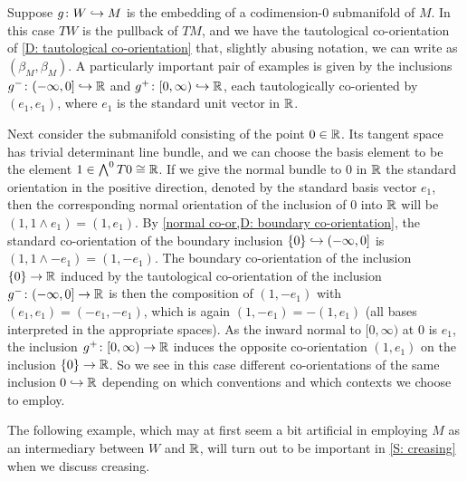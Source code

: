 \begin{example}\label{E: splitting example 1}
	Suppose $g \colon W \hookrightarrow M$ is the embedding of a codimension-$0$ submanifold of $M$.
	In this case $TW$ is the pullback of $TM$, and we have the tautological co-orientation of \cref{D: tautological co-orientation} that, slightly abusing notation, we can write as $(\beta_M,\beta_M)$.
	A particularly important pair of examples is given by the inclusions $g^- \colon (-\infty, 0] \hookrightarrow \mathbb{R}$ and $g^+ \colon [0,\infty) \hookrightarrow \mathbb{R}$, each tautologically co-oriented by $(e_1,e_1)$, where $e_1$ is the standard unit vector in $\mathbb{R}$.

	Next consider the submanifold consisting of the point $0 \in \mathbb{R}$.
	Its tangent space has trivial determinant line bundle, and we can choose the basis element to be the element $1 \in \bigwedge^0 T0 \cong \mathbb{R}$.
    If we give the normal bundle to $0$ in $\mathbb{R}$ the standard orientation in the positive direction, denoted by the standard basis vector $e_1$, then the corresponding normal orientation of the inclusion of $0$ into $\mathbb{R}$ will be $(1, 1 \wedge e_1) = (1, e_1)$.
	By \cref{normal co-or,D: boundary co-orientation}, the standard co-orientation of the boundary inclusion $\{0\} \hookrightarrow (-\infty, 0]$ is $(1, 1 \wedge -e_1) = (1, -e_1)$.
	The boundary co-orientation of the inclusion $\{0\} \to \mathbb{R}$ induced by the tautological co-orientation of the inclusion $g^- \colon (-\infty, 0] \to \mathbb{R}$ is then the composition of $(1, -e_1)$ with $(e_1, e_1)=(-e_1,-e_1)$, which is again $(1,-e_1) = -(1,e_1)$ (all bases interpreted in the appropriate spaces).
	As the inward normal to $[0,\infty)$ at $0$ is $e_1$, the inclusion $g^+ \colon [0,\infty) \to \mathbb{R}$ induces the opposite co-orientation $(1, e_1)$ on the inclusion $\{0\} \to \mathbb{R}$.
	So we see in this case different co-orientations of the same inclusion $0\hookrightarrow \mathbb{R}$ depending on which conventions and which contexts we choose to employ.
\end{example}

The following example, which may at first seem a bit artificial in employing $M$ as an intermediary between $W$ and $\mathbb{R}$, will turn out to be important in \cref{S: creasing} when we discuss creasing.

